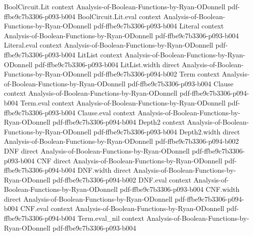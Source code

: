 \begin{theorem}
\leanok
{}
\proofstep
  {BoolCircuit.Lit}
  {context}
  {Analysis-of-Boolean-Functions-by-Ryan-ODonnell}
  {pdf-ffbe9c7b3306-p093-b004}
\proofstep
  {BoolCircuit.Lit.eval}
  {context}
  {Analysis-of-Boolean-Functions-by-Ryan-ODonnell}
  {pdf-ffbe9c7b3306-p093-b004}
\proofstep
  {Literal}
  {context}
  {Analysis-of-Boolean-Functions-by-Ryan-ODonnell}
  {pdf-ffbe9c7b3306-p093-b004}
\proofstep
  {Literal.eval}
  {context}
  {Analysis-of-Boolean-Functions-by-Ryan-ODonnell}
  {pdf-ffbe9c7b3306-p093-b004}
\proofstep
  {LitList}
  {context}
  {Analysis-of-Boolean-Functions-by-Ryan-ODonnell}
  {pdf-ffbe9c7b3306-p093-b004}
\proofstep
  {LitList.width}
  {direct}
  {Analysis-of-Boolean-Functions-by-Ryan-ODonnell}
  {pdf-ffbe9c7b3306-p094-b002}
\proofstep
  {Term}
  {context}
  {Analysis-of-Boolean-Functions-by-Ryan-ODonnell}
  {pdf-ffbe9c7b3306-p093-b004}
\proofstep
  {Clause}
  {context}
  {Analysis-of-Boolean-Functions-by-Ryan-ODonnell}
  {pdf-ffbe9c7b3306-p094-b004}
\proofstep
  {Term.eval}
  {context}
  {Analysis-of-Boolean-Functions-by-Ryan-ODonnell}
  {pdf-ffbe9c7b3306-p093-b004}
\proofstep
  {Clause.eval}
  {context}
  {Analysis-of-Boolean-Functions-by-Ryan-ODonnell}
  {pdf-ffbe9c7b3306-p094-b004}
\proofstep
  {Depth2}
  {context}
  {Analysis-of-Boolean-Functions-by-Ryan-ODonnell}
  {pdf-ffbe9c7b3306-p093-b004}
\proofstep
  {Depth2.width}
  {direct}
  {Analysis-of-Boolean-Functions-by-Ryan-ODonnell}
  {pdf-ffbe9c7b3306-p094-b002}
\proofstep
  {DNF}
  {direct}
  {Analysis-of-Boolean-Functions-by-Ryan-ODonnell}
  {pdf-ffbe9c7b3306-p093-b004}
\proofstep
  {CNF}
  {direct}
  {Analysis-of-Boolean-Functions-by-Ryan-ODonnell}
  {pdf-ffbe9c7b3306-p094-b004}
\proofstep
  {DNF.width}
  {direct}
  {Analysis-of-Boolean-Functions-by-Ryan-ODonnell}
  {pdf-ffbe9c7b3306-p094-b002}
\proofstep
  {DNF.eval}
  {context}
  {Analysis-of-Boolean-Functions-by-Ryan-ODonnell}
  {pdf-ffbe9c7b3306-p093-b004}
\proofstep
  {CNF.width}
  {direct}
  {Analysis-of-Boolean-Functions-by-Ryan-ODonnell}
  {pdf-ffbe9c7b3306-p094-b004}
\proofstep
  {CNF.eval}
  {context}
  {Analysis-of-Boolean-Functions-by-Ryan-ODonnell}
  {pdf-ffbe9c7b3306-p094-b004}
\proofstep
  {Term.eval_nil}
  {context}
  {Analysis-of-Boolean-Functions-by-Ryan-ODonnell}
  {pdf-ffbe9c7b3306-p093-b004}

\end{theorem}
